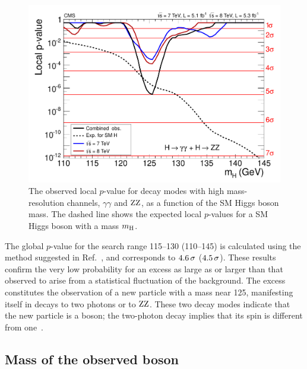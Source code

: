 \documentclass[11pt,twoside,a4paper,cmspaper,final]{cms-tdr}
\begin{document}
\begin{figure} [htbp]
\begin{center}
\includegraphics[width=\cmsFigWideWidth]{rect_pvala_all_energy_hires_smallGGScale_wideX}
\caption{
The observed local $p$-value for decay modes with high mass-resolution channels,
$\gamma\gamma$ and $\mathrm{Z}\mathrm{Z}$, as a function of the SM Higgs
boson mass.
The dashed line shows the expected local $p$-values
for a SM Higgs boson with a mass $m_{\mathrm{H}}$.
}
\label{fig:pvalue_subcomb}
\end{center}
\end{figure}

The global $p$-value for the search range 115--130 (110--145)\GeV
is calculated using the method suggested in Ref.~\cite{LEE}, and corresponds to
$4.6 \,\sigma$ ($4.5 \,\sigma$).
These results confirm the very low probability for an excess as large as or larger than that observed
to arise from a statistical fluctuation of the background.
The excess constitutes the observation of a new
particle with a mass near 125\GeV, manifesting itself in decays to two photons or to $\mathrm{Z}\mathrm{Z}$.
These two decay modes indicate that the new particle is a boson; the two-photon decay implies that its spin is different from one~\cite{Landau,Yang}.

\subsection{Mass of the observed boson}
\end{document}
